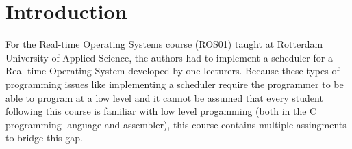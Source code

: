 \section{Introduction}

For the Real-time Operating Systems course (ROS01) taught at Rotterdam University of Applied Science,
the authors had to implement a scheduler for a Real-time Operating System developed by one lecturers.
Because these types of programming issues like implementing a scheduler require the programmer to be able to program at a low level and it cannot be assumed that every student following this course is familiar with low level progamming (both in the C programming language and assembler), this course contains multiple assingments to bridge this gap.


